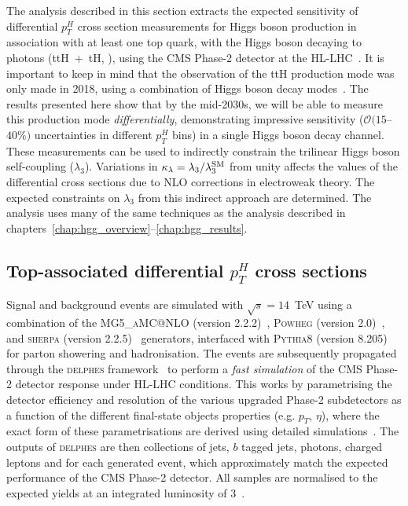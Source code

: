 The analysis described in this section extracts the expected sensitivity of differential $p^H_T$ cross section measurements for Higgs boson production in association with at least one top quark, with the Higgs boson decaying to photons (ttH~+~tH, \Hgg), using the CMS Phase-2 detector at the HL-LHC~\cite{CMS-PAS-FTR-18-020}. It is important to keep in mind that the observation of the ttH production mode was only made in 2018, using a combination of Higgs boson decay modes~\cite{Sirunyan:2018hoz,Aaboud:2018urx}. The results presented here show that by the mid-2030s, we will be able to measure this production mode \textit{differentially}, demonstrating impressive sensitivity ($\mathcal{O}(15$--$40\%)$ uncertainties in different $p_T^H$ bins) in a single Higgs boson decay channel. These measurements can be used to indirectly constrain the trilinear Higgs boson self-coupling ($\lambda_3$). Variations in $\kappa_\lambda = \lambda_3/\lambda_3^{\rm{SM}}$ from unity affects the values of the differential cross sections due to NLO corrections in electroweak theory. The expected constraints on $\lambda_3$ from this indirect approach are determined. The analysis uses many of the same techniques as the \Hgg analysis described in chapters~\ref{chap:hgg_overview}--\ref{chap:hgg_results}.

\subsection{Top-associated differential $p_T^H$ cross sections}
Signal and background events are simulated with $\sqrt{s}=14$~TeV using a combination of the \textsc{MG5\_aMC@NLO} (version 2.2.2)~\cite{Alwall:2014hca}, \textsc{Powheg} (version 2.0)~\cite{Nason:2004rx,Frixione:2007vw,Alioli:2008tz,Nason:2009ai,Alioli:2010xd,Hartanto:2015uka}, and \textsc{sherpa} (version 2.2.5)~\cite{Gleisberg:2008ta} generators, interfaced with \textsc{Pythia8} (version 8.205)~\cite{Sjostrand:2014zea} for parton showering and hadronisation. The events are subsequently propagated through the \textsc{delphes} framework~\cite{deFavereau:2013fsa} to perform a \textit{fast simulation} of the CMS Phase-2 detector response under HL-LHC conditions. This works by parametrising the detector efficiency and resolution of the various upgraded Phase-2 subdetectors as a function of the different final-state objects properties (e.g. $p_T$, $\eta$), where the exact form of these parametrisations are derived using detailed simulations~\cite{Contardo:2020886}. The outputs of \textsc{delphes} are then collections of jets, $b$ tagged jets, photons, charged leptons and \met for each generated event, which approximately match the expected performance of the CMS Phase-2 detector. All samples are normalised to the expected yields at an integrated luminosity of 3~\abinv.

